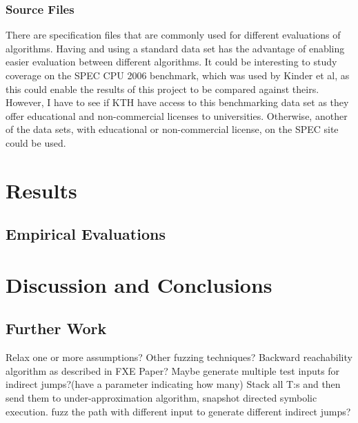 \documentclass{kththesis}
\begin{document}
\subsection{Source Files}
There are specification files that are commonly used for different evaluations of algorithms. Having and using a standard data set has the advantage of enabling easier evaluation between different algorithms. It could be interesting to study coverage on the SPEC CPU 2006 benchmark, which was used by Kinder et al\cite{alternating}, as this could enable the results of this project to be compared against theirs\cite{alternating}. However, I have to see if KTH have access to this benchmarking data set as they offer educational and non-commercial licenses to universities\cite{SPECData}. Otherwise, another of the data sets, with educational or non-commercial license, on the SPEC site could be used\cite{SPECData}.

\chapter{Results}\label{chap:results}

\section{Empirical Evaluations}

\chapter{Discussion and Conclusions}\label{chap:discussionAndConclusions}


\section{Further Work}
Relax one or more assumptions?
Other fuzzing techniques?
Backward reachability algorithm as described in FXE Paper?
Maybe generate multiple test inputs for indirect jumps?(have a parameter indicating how many)
Stack all T:s and then send them to under-approximation algorithm, snapshot directed symbolic execution.
fuzz the path with different input to generate different indirect jumps? 

\printbibliography[heading=bibintoc]



\tailmatter
\end{document}
